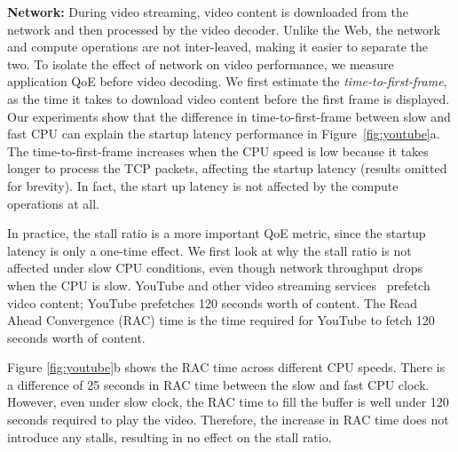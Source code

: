 \noindent \textbf{Network:} During video streaming, video content is downloaded from the network and then processed by the video decoder. Unlike the Web, the network and compute operations are not inter-leaved, making it easier to separate the two. To isolate the effect of network on video performance, we measure application QoE before video decoding. We first estimate the {\em time-to-first-frame}, as the time it takes to download video content before the first frame is displayed. Our experiments show that the difference in time-to-first-frame between slow and fast CPU can explain the startup latency performance in Figure~\ref{fig:youtube}a. The time-to-first-frame increases when the CPU speed is low because it takes longer to process the TCP packets, affecting the startup latency (results omitted for brevity). In fact, the start up latency is not affected by the compute operations at all.

In practice, the stall ratio is a more important QoE metric, since the startup latency is only a one-time effect. We first look at why the stall ratio is not affected under slow CPU conditions, even though network throughput drops when the CPU is slow. YouTube and other video streaming services~\cite{netflix,hbogo} prefetch video content; YouTube prefetches 120 seconds worth of content. The Read Ahead Convergence (RAC) time is the time required for YouTube to fetch  120 seconds worth of content. 

Figure \ref{fig:youtube}b shows the RAC time across different CPU speeds.  There is a difference of 25 seconds in RAC time between the slow and fast CPU clock. However, even under slow clock, the RAC time to fill the buffer is well under 120 seconds required to play the video. Therefore, the increase in RAC time does not introduce any stalls, resulting in no effect on the stall ratio.  %





